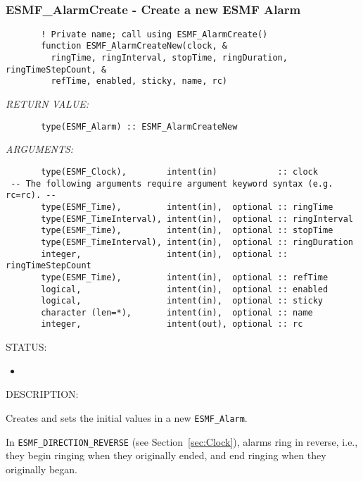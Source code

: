  
\mbox{}\hrulefill\ 
 
\subsubsection [ESMF\_AlarmCreate] {ESMF\_AlarmCreate - Create a new ESMF Alarm}


 
\begin{verbatim}       ! Private name; call using ESMF_AlarmCreate()
       function ESMF_AlarmCreateNew(clock, &
         ringTime, ringInterval, stopTime, ringDuration, ringTimeStepCount, &
         refTime, enabled, sticky, name, rc)
 \end{verbatim}{\em RETURN VALUE:}
\begin{verbatim}       type(ESMF_Alarm) :: ESMF_AlarmCreateNew
 \end{verbatim}{\em ARGUMENTS:}
\begin{verbatim}       type(ESMF_Clock),        intent(in)            :: clock
 -- The following arguments require argument keyword syntax (e.g. rc=rc). --
       type(ESMF_Time),         intent(in),  optional :: ringTime
       type(ESMF_TimeInterval), intent(in),  optional :: ringInterval
       type(ESMF_Time),         intent(in),  optional :: stopTime
       type(ESMF_TimeInterval), intent(in),  optional :: ringDuration
       integer,                 intent(in),  optional :: ringTimeStepCount
       type(ESMF_Time),         intent(in),  optional :: refTime
       logical,                 intent(in),  optional :: enabled
       logical,                 intent(in),  optional :: sticky
       character (len=*),       intent(in),  optional :: name
       integer,                 intent(out), optional :: rc
 \end{verbatim}
{\sf STATUS:}
   \begin{itemize}
   \item{}
   \end{itemize}
  
{\sf DESCRIPTION:\\ }


       Creates and sets the initial values in a new {\tt ESMF\_Alarm}.
  
       In {\tt ESMF\_DIRECTION\_REVERSE} (see Section~\ref{sec:Clock}), alarms
       ring in reverse, i.e., they begin ringing when they originally ended,
       and end ringing when they originally began.
  
